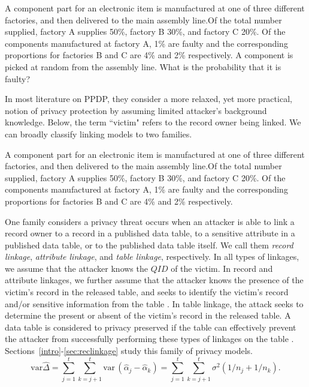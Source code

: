 \begin{shadebox}
A component part for an electronic item is
manufactured at one of three different factories, and then delivered to
the main assembly line.Of the total number supplied, factory A supplies
50\%, factory B 30\%, and factory C 20\%. Of the components
manufactured at factory A, 1\% are faulty and the corresponding
proportions for factories B and C are 4\% and 2\% respectively. A
component is picked at random from the assembly line. What is the
probability that it is faulty? 
\end{shadebox}

In most literature on PPDP, they \cite{jolliffe2002pca} consider a more relaxed, yet more practical, notion of privacy protection by assuming limited attacker's background knowledge. Below, the term ``victim" refers to the record owner being linked. We can broadly classify linking models to two families.

\begin{extract}
A component part for an electronic item is \cite{hyvarinen2001ica}
manufactured at one of three different factories, and then delivered to
the main assembly line.Of the total number supplied, factory A supplies
50\%, factory B 30\%, and factory C 20\%. Of the components
manufactured at factory A, 1\% are faulty and the corresponding
proportions for factories B and C are 4\% and 2\% respectively. 
\end{extract}


One family considers a privacy threat occurs when an attacker is able to link a record owner to a record in a published data table, to a sensitive attribute in a published data table, or to the published data table itself. We call them \emph{record linkage}, \emph{attribute linkage}, and \emph{table linkage}, respectively. In all types of linkages, we assume that the attacker knows the $QID$ of the victim. In record and attribute linkages, we further assume that the attacker knows the presence of the victim's record in the released table, and seeks to identify the victim's record and/or sensitive information from the table \cite{yao2002can}. In table linkage, the attack seeks to determine the present or absent of the victim's record in the released table. A data table is considered to privacy preserved if the table can effectively prevent the attacker from successfully performing these types of linkages on the table \cite{madden2002tta}. Sections~\ref{intro}-\ref{sec:reclinkage} study this family of privacy models.
\begin{equation}
\mbox{var}\widehat{\Delta} = \sum_{j = 1}^t \sum_{k = j+1}^t
\mbox{var}\,(\hat{\alpha}_j - \hat{\alpha}_k)  = \sum_{j = 1}^t
\sum_{k = j+1}^t \sigma^2(1/n_j + 1/n_k). \label{2delvart2}
\end{equation}


